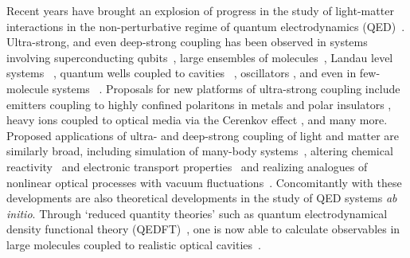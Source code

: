 \documentclass[aps,prl,twocolumn,
	groupedaddress,superscriptaddress,
	amsfonts,amssymb,amsmath,floatfix,
	citeautoscript]{revtex4-1}
\begin{document}
Recent years have brought an explosion of progress in the study of light-matter interactions in the non-perturbative regime of quantum electrodynamics (QED)~\cite{flick7strong,ruggenthaler2017b,forn2018ultrastrong,baranov2018}. Ultra-strong, and even deep-strong coupling has been observed in systems involving superconducting qubits~\cite{blais2004,wallraff2004,forn2010observation,niemczyk2010circuit,yoshihara2017superconducting,forn2017ultrastrong}, large ensembles of molecules~\cite{hutchison2012,coles2014,coles2014b,shalabney2015coherent, thomas2016,ebbesen2016,stranius2018,thomas2018}, Landau level systems ~\cite{scalari2012ultrastrong,zhang2016collective},  quantum wells coupled to cavities ~\cite{todorov2010ultrastrong,geiser2012ultrastrong}, oscillators \cite{markovic2018demonstration}, and even in few-molecule systems ~\cite{benz2016,chikkaraddy2016}. Proposals for new platforms of ultra-strong coupling include emitters coupling to highly confined polaritons in metals and polar insulators \cite{rivera2016shrinking}, heavy ions coupled to optical media via the Cerenkov effect \cite{carmes2018non}, and many more. Proposed applications of ultra- and deep-strong coupling of light and matter are similarly broad, including simulation of many-body systems~\cite{forn2018ultrastrong}, altering chemical reactivity~\cite{hutchison2012, thomas2016,thomas2018, flick2017, herrera2016,feist2017,martinez2017} and electronic transport properties~\cite{orgiu2015} and realizing analogues of nonlinear optical processes with vacuum fluctuations~\cite{kockum2017deterministic}. Concomitantly with these developments are also theoretical developments in the study of QED systems \textit{ab initio}. Through `reduced quantity theories' such as quantum electrodynamical density functional theory (QEDFT)~\cite{tokatly2013,ruggenthaler2014,flick2015,dimitrov2017,flick2018,flick2018b}, one is now able to calculate observables in large molecules coupled to realistic optical cavities~\cite{flick2017c, flick2018b,flick2018}. 
\end{document}
